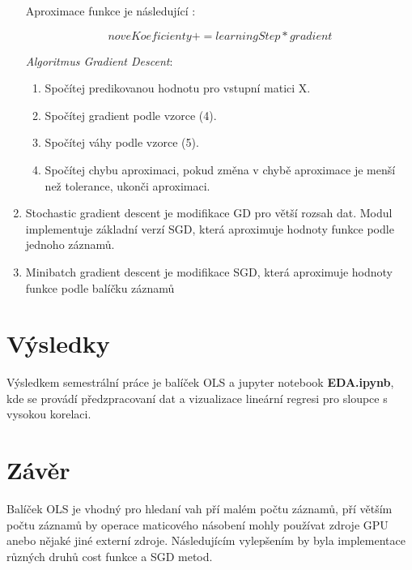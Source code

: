 \documentclass[czech]{pyt-report}
\begin{document}
\begin{enumerate}
Aproximace funkce je následující :

\begin{equation}
noveKoeficienty += learningStep * gradient
\end{equation}

\textit{Algoritmus Gradient Descent}:

\begin{enumerate}
\item Spočítej predikovanou hodnotu pro vstupní matici X.
\item Spočítej gradient podle vzorce (4).
\item Spočítej váhy podle vzorce (5).
\item Spočítej chybu aproximaci, pokud změna v chybě aproximace je menší než tolerance, ukonči aproximaci.
\end{enumerate}

\item Stochastic gradient descent je modifikace GD pro větší rozsah dat. Modul implementuje základní verzí SGD, která aproximuje hodnoty funkce podle jednoho záznamů. \cite{sgd_ref}
\item Minibatch gradient descent je modifikace SGD, která aproximuje hodnoty funkce podle balíčku záznamů
\end{enumerate}

\section{Výsledky}
Výsledkem semestrální práce je balíček OLS a jupyter notebook \textbf{EDA.ipynb}, kde se provádí předzpracovaní dat a vizualizace lineární regresi pro sloupce s vysokou korelaci.
\section{Závěr}
Balíček OLS je vhodný pro hledaní vah pří malém počtu záznamů, pří větším počtu záznamů by operace maticového násobení mohly používat zdroje GPU anebo nějaké jiné externí zdroje. Následujícím vylepšením by byla implementace různých druhů cost funkce a SGD metod.
%

\end{document}
